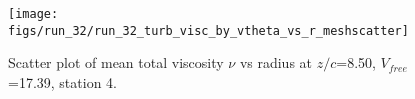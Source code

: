 \begin{figure}[H]
\centering
\texttt{[image: figs/run\_32/run\_32\_turb\_visc\_by\_vtheta\_vs\_r\_meshscatter]}
\caption{Scatter plot of mean total viscosity $\nu$ vs radius at $z/c$=8.50, $V_{free}$=17.39, station 4.}
\label{fig:run_32_turb_visc_by_vtheta_vs_r_meshscatter}
\end{figure}


